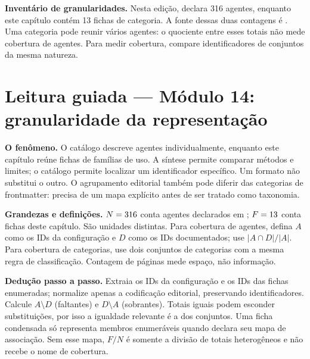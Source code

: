 \begin{resultado}
\textbf{Inventário de granularidades.} Nesta edição, 
declara 316 agentes, enquanto este capítulo contém
13 fichas de categoria. A fonte dessas duas contagens
é . Uma categoria pode reunir vários agentes:
o quociente entre esses totais não mede cobertura de agentes. Para medir
cobertura, compare identificadores de conjuntos da mesma natureza.
\end{resultado}

\section[Leitura guiada]{Leitura guiada — Módulo 14: granularidade da representação}
\begin{descricao}
\textbf{O fenômeno.} O catálogo descreve agentes individualmente, enquanto este
capítulo reúne fichas de famílias de uso. A síntese permite comparar métodos
e limites; o catálogo permite localizar um identificador específico. Um formato
não substitui o outro. O agrupamento editorial também pode diferir das categorias
de frontmatter: precisa de um mapa explícito antes de ser tratado como taxonomia.
\end{descricao}
\begin{definicao}
\textbf{Grandezas e definições.} $N=316$ conta agentes declarados em
; $F=13$ conta fichas deste capítulo.
São unidades distintas. Para cobertura de agentes, defina $A$ como os IDs da
configuração e $D$ como os IDs documentados; use $|A\cap D|/|A|$.
Para cobertura de categorias, use dois conjuntos de categorias com a mesma
regra de classificação. Contagem de páginas mede espaço, não informação.
\end{definicao}
\begin{metodo}
\textbf{Dedução passo a passo.} Extraia os IDs da configuração e os IDs das fichas
enumeradas; normalize apenas a codificação editorial, preservando identificadores.
Calcule $A\setminus D$ (faltantes) e $D\setminus A$ (sobrantes). Totais iguais
podem esconder substituições, por isso a igualdade relevante é a dos conjuntos.
Uma ficha condensada só representa membros enumeráveis quando declara seu mapa
de associação. Sem esse mapa, $F/N$ é somente a divisão de totais heterogêneos
e não recebe o nome de cobertura.
\end{metodo}
